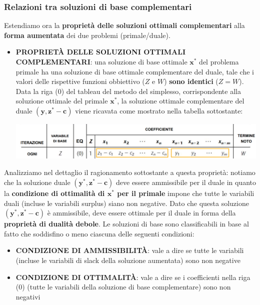 \documentclass[12pt]{article}
\begin{document}
\subsubsection{Relazioni tra soluzioni di base complementari}
Estendiamo ora la \textbf{proprietà delle soluzioni ottimali complementari} alla \textbf{forma aumentata} dei due problemi (primale/duale).
\begin{itemize}
    \item \textbf{PROPRIETÀ DELLE SOLUZIONI OTTIMALI COMPLEMENTARI}: una soluzione di base ottimale $\boldsymbol{x}^*$ del problema primale ha una soluzione
    di base ottimale complementare del duale, tale che i valori delle rispettive funzioni obbiettivo ($Z$ e $W$) \textbf{sono identici} ($Z = W$). Data la riga (0) del
    tableau del metodo del simplesso, corrispondente alla soluzione ottimale del primale $\boldsymbol{x}^*$, la soluzione ottimale complementare del duale
    $(\boldsymbol{y}, \boldsymbol{z}^* - \boldsymbol{c})$ viene ricavata come mostrato nella tabella sottostante:
    \begin{center}
        \includegraphics[width = 1\linewidth]{Images/54.png}
    \end{center}
\end{itemize}
Analizziamo nel dettaglio il ragionamento sottostante a questa proprietà: notiamo che la soluzione duale $(\boldsymbol{y}^*, \boldsymbol{z}^* - \boldsymbol{c})$ deve essere ammissibile per il duale
in quanto la \textbf{condizione di ottimalità di $\boldsymbol{x}^*$ per il primale} impone che tutte le variabili duali (incluse le variabili surplus) siano non negative.
Dato che questa soluzione $(\boldsymbol{y}^*, \boldsymbol{z}^* - \boldsymbol{c})$ è ammissibile, deve essere ottimale per il duale in forma della \textbf{proprietà di dualità debole}.
Le soluzioni di base sono classificabili in base al fatto che soddisfino o meno ciascuna delle seguenti condizioni:
\begin{itemize}
    \item \textbf{CONDIZIONE DI AMMISSIBILITÀ}: vale a dire se tutte le variabili (incluse le variabili di slack della soluzione aumentata) sono non negative
    \item \textbf{CONDIZIONE DI OTTIMALITÀ}: vale a dire se i coefficienti nella riga (0) (tutte le variabili della soluzione di base complementare) sono non negativi
\end{itemize}
\end{document}
